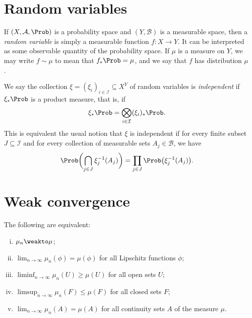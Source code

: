 \documentclass[../main]{subfiles}
\begin{document}


\section{Random variables}

If \((X, \mathcal{A}, \Prob)\) is a probability space and \((Y, \mathcal{B})\) is a measurable space, then a \emph{random variable} is simply a measurable function \(f \colon X \to Y\). It can be interpreted as some observable quantity of the probability space. If \(\mu\) is a measure on \(Y\), we may write \(f \sim \mu\) to mean that \(f_*\Prob = \mu\), and we say that \(f\) has distribution \(\mu\).

\begin{definition}
  We say the collection \(\xi = (\xi_i)_{i \in \mathcal{I}} \subseteq X^Y\) of random variables is \textit{independent} if \(\xi_*\Prob\) is a product measure, that is, if
  \begin{equation*}
    \xi_*\Prob = \bigotimes_{i \in \mathcal{I}}(\xi_i)_*\Prob.
  \end{equation*}
  This is equivalent the usual notion that \(\xi\) is independent if for every finite subset \(J \subseteq \mathcal{I}\) and for every collection of measurable sets \(A_j \in \mathcal{B}\), we have
  \begin{equation*}
    \Prob \rpar[\bigg]{\bigcap_{j \in J} \xi_j^{-1}(A_j)} = \prod_{j \in J} \Prob \rpar*{\xi_j^{-1}(A_j)}.
  \end{equation*}
\end{definition}

\section{Weak convergence}

\begin{proposition}[Portmanteau]\label{thm:portmanteau}
  The following are equivalent:
  \begin{enumerate}[i., left=0pt, topsep=3pt]
    \item \(\mu_n \weakto \mu\);
    \item \(\lim_{n \to \infty} \mu_n(\phi) = \mu(\phi)\) for all Lipschitz functions \(\phi\);
    \item \(\liminf_{n \to \infty} \mu_n(U) \geq \mu(U)\) for all open sets \(U\);
    \item \(\limsup_{n \to \infty} \mu_n(F) \leq \mu(F)\) for all closed sets \(F\);
    \item \(\lim_{n \to \infty} \mu_n(A) = \mu(A)\) for all continuity sets \(A\) of the measure \(\mu\).
  \end{enumerate}
\end{proposition}
\end{document}
